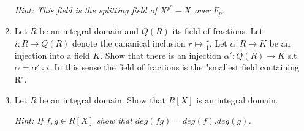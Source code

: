 \documentclass[12pt,a4paper]{article}
\begin{document}
\begin{enumerate}
  \emph{Hint: This field is the splitting field of $X^{p^n}-X$ over $F_p$.} 
\item Let $R$ be an integral domain and $Q(R)$ its field of fractions. Let $i:R\xrightarrow{}Q(R)$ denote the cananical inclusion $r\mapsto \frac{r}{1}$.  Let $\alpha:R\xrightarrow{}K$ be an injection into a field $K$. Show that there is an injection $\alpha':Q(R)\xrightarrow{}K$ s.t. $\alpha=\alpha'\circ i$. In this sense the field of fractions is the "smallest field containing R".
\item Let $R$ be an integral domain. Show that $R[X]$ is an integral domain.

  \emph{  Hint: If $f,g\in R[X]$ show that $deg(fg)=deg(f).deg(g)$.}

\end{enumerate}
\end{document}
